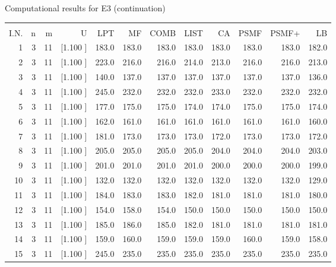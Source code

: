 \documentclass[12pt,a4paper]{article}
\begin{document}
\newpage
\begin{center}
 Computational results for E3 (continuation) {\tiny
\begin{tabular}{r r r r r r r r r r r r}\hline
    &   &   &          &        &        &        &        &        &        &        &       \\[-0.1in]
  I.N.  &  n  &  m  &  U  &  LPT  &  MF  &  COMB  &  LIST  &  CA  & PSMF &PSMF+ & LB \\[0.03in]
\hline
   1&  3& 11&[1.100     ]&   183.0&   183.0&   183.0&   183.0&   183.0&   183.0&   183.0&   182.0\\[-0.02in]
   2&  3& 11&[1.100     ]&   223.0&   216.0&   216.0&   214.0&   213.0&   216.0&   216.0&   213.0\\[-0.02in]
   3&  3& 11&[1.100     ]&   140.0&   137.0&   137.0&   137.0&   137.0&   137.0&   137.0&   136.0\\[-0.02in]
   4&  3& 11&[1.100     ]&   245.0&   232.0&   232.0&   232.0&   233.0&   232.0&   232.0&   232.0\\[-0.02in]
   5&  3& 11&[1.100     ]&   177.0&   175.0&   175.0&   174.0&   174.0&   175.0&   175.0&   174.0\\[-0.02in]
   6&  3& 11&[1.100     ]&   162.0&   161.0&   161.0&   161.0&   161.0&   161.0&   161.0&   160.0\\[-0.02in]
   7&  3& 11&[1.100     ]&   181.0&   173.0&   173.0&   173.0&   172.0&   173.0&   173.0&   172.0\\[-0.02in]
   8&  3& 11&[1.100     ]&   205.0&   205.0&   205.0&   205.0&   204.0&   204.0&   204.0&   203.0\\[-0.02in]
   9&  3& 11&[1.100     ]&   201.0&   201.0&   201.0&   201.0&   200.0&   200.0&   200.0&   199.0\\[-0.02in]
  10&  3& 11&[1.100     ]&   132.0&   132.0&   132.0&   132.0&   132.0&   132.0&   132.0&   129.0\\[-0.02in]
  11&  3& 11&[1.100     ]&   184.0&   183.0&   183.0&   182.0&   181.0&   181.0&   181.0&   180.0\\[-0.02in]
  12&  3& 11&[1.100     ]&   154.0&   158.0&   154.0&   150.0&   150.0&   150.0&   150.0&   150.0\\[-0.02in]
  13&  3& 11&[1.100     ]&   185.0&   186.0&   185.0&   182.0&   181.0&   181.0&   181.0&   181.0\\[-0.02in]
  14&  3& 11&[1.100     ]&   159.0&   160.0&   159.0&   159.0&   159.0&   160.0&   159.0&   158.0\\[-0.02in]
  15&  3& 11&[1.100     ]&   245.0&   235.0&   235.0&   235.0&   235.0&   235.0&   235.0&   235.0\\[-0.02in]

\end{tabular}}
\end{center}
\end{document}
